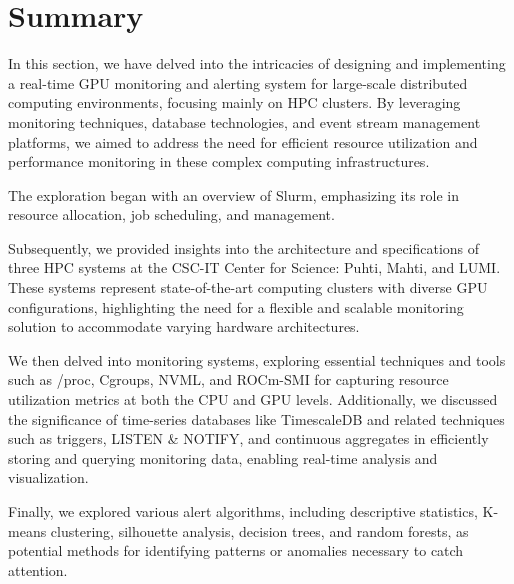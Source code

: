 
\section{Summary}
In this section, we have delved into the intricacies of designing and implementing a real-time GPU monitoring and alerting system for large-scale distributed computing environments, focusing mainly on HPC clusters. By leveraging monitoring techniques, database technologies, and event stream management platforms, we aimed to address the need for efficient resource utilization and performance monitoring in these complex computing infrastructures.

The exploration began with an overview of Slurm, emphasizing its role in resource allocation, job scheduling, and management.

Subsequently, we provided insights into the architecture and specifications of three HPC systems at the CSC-IT Center for Science: Puhti, Mahti, and LUMI. These systems represent state-of-the-art computing clusters with diverse GPU configurations, highlighting the need for a flexible and scalable monitoring solution to accommodate varying hardware architectures.

We then delved into monitoring systems, exploring essential techniques and tools such as /proc, Cgroups, NVML, and ROCm-SMI for capturing resource utilization metrics at both the CPU and GPU levels. Additionally, we discussed the significance of time-series databases like TimescaleDB and related techniques such as triggers, LISTEN \& NOTIFY, and continuous aggregates in efficiently storing and querying monitoring data, enabling real-time analysis and visualization.


Finally, we explored various alert algorithms, including descriptive statistics, K-means clustering, silhouette analysis, decision trees, and random forests, as potential methods for identifying patterns or anomalies necessary to catch attention.
